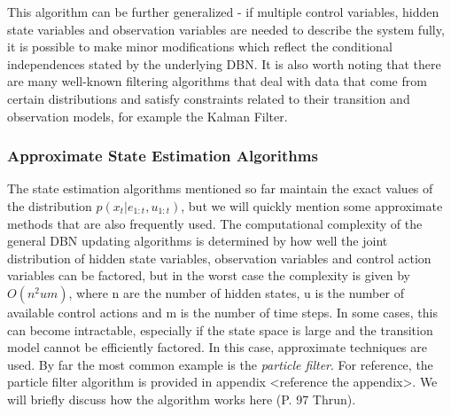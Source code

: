 This algorithm can be further generalized - if multiple control variables, hidden state variables and observation variables are needed to describe the system fully, it is possible to make minor modifications which reflect the conditional independences stated by the underlying DBN. It is also worth noting that there are many well-known filtering algorithms that deal with data that come from certain distributions and satisfy constraints related to their transition and observation models, for example the Kalman Filter.







\subsubsection{Approximate State Estimation Algorithms}
The state estimation algorithms mentioned so far maintain the exact values of the distribution $p(x_t | e_{1:t}, u_{1:t})$, but we will quickly mention some approximate methods that are also frequently used. The computational complexity of the general DBN updating algorithms is determined by how well the joint distribution of hidden state variables, observation variables and control action variables can be factored, but in the worst case the complexity is given by $O(n^2um)$, where n are the number of hidden states, u is the number of available control actions and m is the number of time steps. In some cases, this can become intractable, especially if the state space is large and the transition model cannot be efficiently factored. In this case, approximate techniques are used. By far the most common example is the \textit{particle filter}. For reference, the particle filter algorithm is provided in appendix <reference the appendix>. We will briefly discuss how the algorithm works here (P. 97 Thrun).

